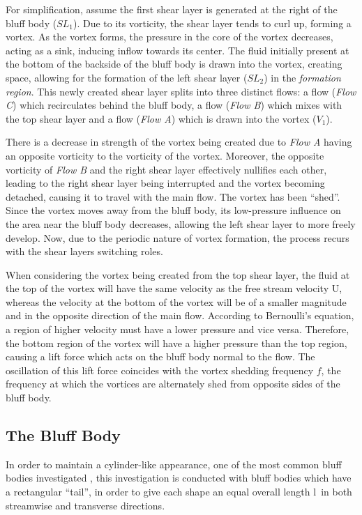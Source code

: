 For simplification, assume the first shear layer is generated at the right of the bluff body ($SL_{1}$). Due to its vorticity, the shear layer tends to curl up, forming a vortex. As the vortex forms, the pressure in the core of the vortex decreases, acting as a sink, inducing inflow towards its center. The fluid initially present at the bottom of the backside of the bluff body is drawn into the vortex, creating space, allowing for the formation of the left shear layer ($SL_{2}$) in the \textit{formation region}. This newly created shear layer splits into three distinct flows: a flow (\textit{Flow C}) which recirculates behind the bluff body, a flow (\textit{Flow B}) which mixes with the top shear layer and a flow (\textit{Flow A}) which is drawn into the vortex ($V_{1}$).

There is a decrease in strength of the vortex being created due to \textit{Flow A} having an opposite vorticity to the vorticity of the vortex. Moreover, the opposite vorticity of \textit{Flow B} and the right shear layer effectively nullifies each other, leading to the right shear layer being interrupted and the vortex becoming detached, causing it to travel with the main flow. The vortex has been “shed”. Since the vortex moves away from the bluff body, its low-pressure influence on the area near the bluff body decreases, allowing the left shear layer to more freely develop. Now, due to the periodic nature of vortex formation, the process recurs with the shear layers switching roles. 

When considering the vortex being created from the top shear layer, the fluid at the top of the vortex will have the same velocity as the free stream velocity U, whereas the velocity at the bottom of the vortex will be of a smaller magnitude and in the opposite direction of the main flow. According to Bernoulli’s equation, a region of higher velocity must have a lower pressure and vice versa. Therefore, the bottom region of the vortex will have a higher pressure than the top region, causing a lift force which acts on the bluff body normal to the flow. The oscillation of this lift force coincides with the vortex shedding frequency $f$, the frequency at which the vortices are alternately shed from opposite sides of the bluff body. 

\subsection{The Bluff Body}
\label{sec:bluffBody}
In order to maintain a cylinder-like appearance, one of the most common bluff bodies investigated \parencite[475]{rocchi2002_vortex}, this investigation is conducted with bluff bodies which have a rectangular “tail”, in order to give each shape an equal overall length l\ in both streamwise and transverse directions.

